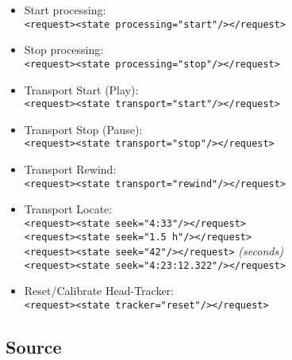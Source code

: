 \begin{itemize}
  \item Start processing:\\
    \verb|<request><state processing="start"/></request>|

  \item Stop processing:\\
    \verb|<request><state processing="stop"/></request>|

  \item Transport Start (Play):\\
    \verb|<request><state transport="start"/></request>|

  \item Transport Stop (Pause):\\
    \verb|<request><state transport="stop"/></request>|

  \item Transport Rewind:\\
    \verb|<request><state transport="rewind"/></request>|

  \item Transport Locate:\\
    \verb|<request><state seek="4:33"/></request>|\\
    \verb|<request><state seek="1.5 h"/></request>|\\
    \verb|<request><state seek="42"/></request>| \emph{(seconds)}\\
    \verb|<request><state seek="4:23:12.322"/></request>|
  \item Reset/Calibrate Head-Tracker:\\
    \verb|<request><state tracker="reset"/></request>|
\end{itemize}

\subsection{Source}

